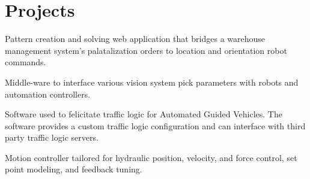 \documentclass[]{TTurner}
\begin{document}
\begin{minipage}[t]{0.70\textwidth}

\section{Projects}

\begin{tightemize}
\item Pattern creation and solving web application that bridges a warehouse management system's palatalization orders to location and orientation robot commands. 
\end{tightemize}
\sectionsep

\begin{tightemize}
\item Middle-ware to interface various vision system pick parameters with robots and automation controllers.
\end{tightemize}
\sectionsep

\begin{tightemize}
\item Software used to felicitate traffic logic for Automated Guided Vehicles. The software provides a custom traffic logic configuration and can interface with third party traffic logic servers.
\end{tightemize}
\sectionsep

\begin{tightemize}
\item Motion controller tailored for hydraulic position, velocity, and force control, set point modeling, and feedback tuning.
\end{tightemize}
\sectionsep


%
%

\end{minipage} 
\end{document}
